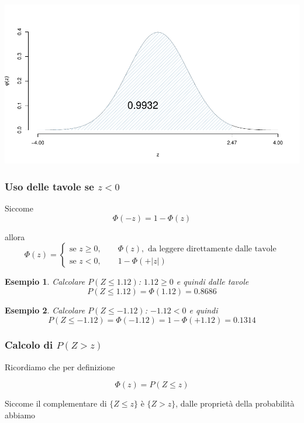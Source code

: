 \documentclass[
  11pt,
]{book}
\theoremstyle{mytheoremstyle}
\theoremstyle{mydefstyle}
\newtheorem{example}{{Esempio}}[section]
\begin{document}
\begin{center}\includegraphics{Appunti_di_Statistica_2025_files/figure-latex/07c-Normale-15,-1} \end{center}

\subsubsection{\texorpdfstring{Uso delle tavole se \(z<0\)}{Uso delle tavole se z\textless0}}\label{uso-delle-tavole-se-z0}

Siccome
\[\Phi(-z)=1-\Phi(z)\]

allora
\[\Phi(z)=\begin{cases}
\text{se }z\geq 0, \qquad \Phi(z),\text{ da leggere direttamente dalle tavole}\\
\text{se } z < 0, \qquad 1-\Phi(+|z|)
\end{cases}\]

\begin{example}
Calcolare \(P(Z\leq 1.12)\): \(1.12\geq 0\) e quindi dalle tavole
\[P(Z\leq 1.12)=\Phi(1.12)=0.8686\]
\end{example}

\begin{example}
Calcolare \(P(Z\leq -1.12)\): \(-1.12< 0\) e quindi
\[P(Z\leq -1.12)=\Phi(-1.12)=1-\Phi(+1.12)=0.1314\]
\end{example}

\subsubsection{\texorpdfstring{Calcolo di \(P(Z>z)\)}{Calcolo di P(Z\textgreater z)}}\label{calcolo-di-pzz}

Ricordiamo che per definizione

\[\Phi(z)=P(Z\leq z)\]

Siccome il complementare di \(\{Z\leq z\}\) è \(\{Z> z\}\), dalle proprietà della probabilità abbiamo
\end{document}
